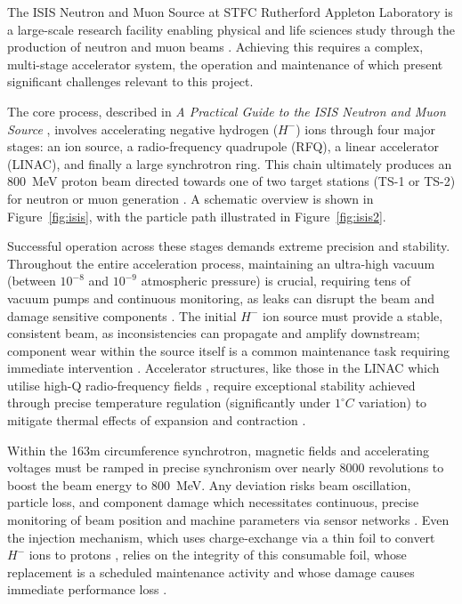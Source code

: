 \documentclass[10pt,oneside]{report}
\begin{document}


The ISIS Neutron and Muon Source at STFC Rutherford Appleton Laboratory is a large-scale research facility enabling physical and life sciences study through the production of neutron and muon beams \cite{thomason2019isis}. Achieving this requires a complex, multi-stage accelerator system, the operation and maintenance of which present significant challenges relevant to this project.

The core process, described in \textit{A Practical Guide to the ISIS Neutron and Muon Source} \cite{2021practicalguide}, involves accelerating negative hydrogen ($H^-$) ions through four major stages: an ion source, a radio-frequency quadrupole (RFQ), a linear accelerator (LINAC), and finally a large synchrotron ring. This chain ultimately produces an 800~MeV proton beam directed towards one of two target stations (TS-1 or TS-2) for neutron or muon generation \cite{2021practicalguide}. A schematic overview is shown in Figure~\ref{fig:isis}, with the particle path illustrated in Figure~\ref{fig:isis2}.

Successful operation across these stages demands extreme precision and stability. Throughout the entire acceleration process, maintaining an ultra-high vacuum (between $10^{-8}$ and $10^{-9}$ atmospheric pressure) is crucial, requiring tens of vacuum pumps and continuous monitoring, as leaks can disrupt the beam and damage sensitive components \cite{2021practicalguide}. The initial $H^-$ ion source must provide a stable, consistent beam, as inconsistencies can propagate and amplify downstream; component wear within the source itself is a common maintenance task requiring immediate intervention \cite{2021practicalguide}. Accelerator structures, like those in the LINAC which utilise high-Q radio-frequency fields \cite{michael2006electronic}, require exceptional stability achieved through precise temperature regulation (significantly under $1^\circ C$ variation) to mitigate thermal effects of expansion and contraction \cite{2021practicalguide}.

Within the 163m circumference synchrotron, magnetic fields and accelerating voltages must be ramped in precise synchronism over nearly 8000 revolutions to boost the beam energy to 800~MeV. Any deviation risks beam oscillation, particle loss, and component damage which necessitates continuous, precise monitoring of beam position and machine parameters via sensor networks \cite{2021practicalguide}. Even the injection mechanism, which uses charge-exchange via a thin foil to convert $H^-$ ions to protons \cite{2021practicalguide, ankenbrandt1980h}, relies on the integrity of this consumable foil, whose replacement is a scheduled maintenance activity and whose damage causes immediate performance loss \cite{2021practicalguide}.
\end{document}
